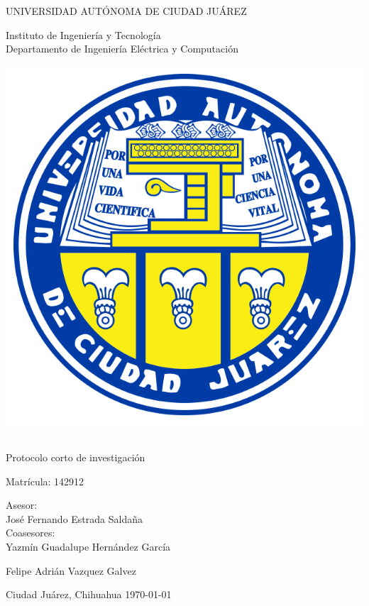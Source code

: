 \thispagestyle{empty}

\begin{center} \vfill

{\Large UNIVERSIDAD AUTÓNOMA DE CIUDAD JUÁREZ}\\
\vspace{6mm}
{\large Instituto de Ingeniería y Tecnología\\
\vspace{6mm}
Departamento de Ingeniería Eléctrica y Computación
\vspace{20mm}

\includegraphics [scale=0.7]{images/escudo-uacj.png}
\vspace{10mm}

\thetitle\\

\vspace{15mm}
Protocolo corto de investigación\\
\vspace{5mm}

\theauthor\hspace{10mm} Matrícula: 142912\\
\vspace{15mm}

Asesor:\\
José Fernando Estrada Saldaña
\\
\vspace{5mm}
Coasesores:\\
Yazmín Guadalupe Hernández García

Felipe Adrián Vazquez Galvez
\\
} \vfill
	Ciudad Juárez, Chihuahua \hspace{30mm}\today


\end{center}
